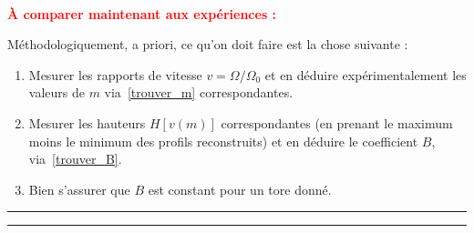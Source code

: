 \documentclass[10pt,a4paper, oneside, fleqn]{myarticle}
\begin{document}
\bigskip
~

\centerline{\bfseries \sffamily \Large  \textcolor{red}{À comparer maintenant aux expériences : }}


\bigskip
  
\noindent Méthodologiquement, a priori, ce qu'on doit faire est la chose suivante :
\begin{enumerate}
\item Mesurer les rapports de vitesse $v=\Omega/\Omega_0$ et en déduire expérimentalement les valeurs de $m$ via~\eqref{trouver_m} correspondantes.
\item  Mesurer les hauteurs $H[v(m)]$ correspondantes (en prenant  le maximum moins le minimum des profils reconstruits) et   en déduire  le coefficient $B$, via~\eqref{trouver_B}.
\item Bien s'assurer que $B$  est constant pour un tore donné.
\end{enumerate}


\vfill

\noindent\rule{\textwidth}{1pt}

\small\tableofcontents

\medskip

\noindent\rule{\textwidth}{1pt}
\end{document}
